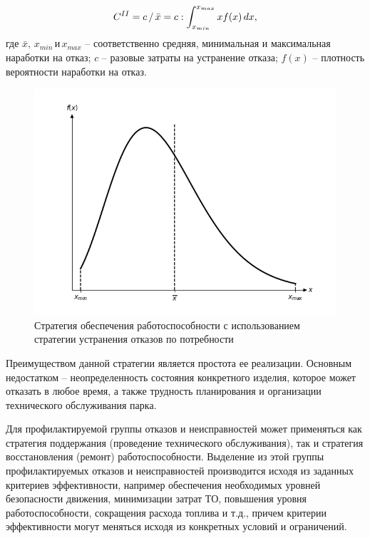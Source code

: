 \documentclass[../nirs.tex]{subfiles}
\begin{document}
\begin{equation*}
    C^{\rom{2}} =
    c\,/\,\bar{x} =
    c : \int_{x_{min}}^{x_{max}} x f(x)\,dx,
\end{equation*}
где $\bar{x},\,x_{min} \,\text{и} \,x_{max}$ -- соответственно средняя,
минимальная и максимальная наработки на отказ; $c$ -- разовые затраты на
устранение отказа; $f(x)$ -- плотность вероятности наработки на отказ.

\begin{figure}[H]
\centering
\includegraphics[keepaspectratio,width=\textwidth]{./images/pdf.a.png}
\caption{Стратегия обеспечения работоспособности с использованием стратегии
устранения отказов по потребности}
\label{fig:pdf.a}
\end{figure}

Преимуществом данной стратегии является простота ее реализации. Основным
недостатком -- неопределенность состояния конкретного изделия, которое может
отказать в любое время, а также трудность планирования и организации
технического обслуживания парка.

Для профилактируемой группы отказов и неисправностей может применяться как
стратегия поддержания (проведение технического обслуживания), так и стратегия
восстановления (ремонт) работоспособности. Выделение из этой группы
профилактируемых отказов и неисправностей производится исходя из заданных
критериев эффективности, например обеспечения необходимых уровней безопасности
движения, минимизации затрат ТО, повышения уровня работоспособности,
сокращения расхода топлива и т.д., причем критерии эффективности могут меняться
исходя из конкретных условий и ограничений.
\end{document}
